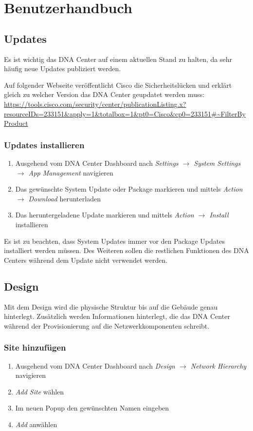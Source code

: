 \section{Benutzerhandbuch}

\subsection{Updates}
Es ist wichtig das DNA Center auf einem aktuellen Stand zu halten, da sehr häufig neue Updates publiziert werden.

Auf folgender Webseite veröffentlicht Cisco die Sicherheitslücken und erklärt gleich zu welcher Version das DNA Center geupdatet werden muss:
\url{https://tools.cisco.com/security/center/publicationListing.x?resourceIDs=233151\&apply=1\&totalbox=1\&pt0=Cisco\&cp0=233151\#~FilterByProduct}

\subsubsection{Updates installieren}
\begin{enumerate}
	\item Ausgehend vom DNA Center Dashboard nach \textit{Settings $\rightarrow$ System Settings $\rightarrow$ App Management} navigieren
	\item Das gewünschte System Update oder Package markieren und mittels \textit{Action $\rightarrow$ Download} herunterladen
	\item Das heruntergeladene Update markieren und mittels \textit{Action $\rightarrow$ Install} installieren
\end{enumerate}

Es ist zu beachten, dass System Updates immer vor den Package Updates installiert werden müssen. Des Weiteren sollen die restlichen Funktionen des DNA Centers während dem Update nicht verwendet werden.

\subsection{Design}
Mit dem Design wird die physische Struktur bis auf die Gebäude genau hinterlegt. Zusätzlich werden Informationen hinterlegt, die das DNA Center während der Provisionierung auf die Netzwerkkomponenten schreibt.

\subsubsection{Site hinzufügen}
\begin{enumerate}
	\item Ausgehend vom DNA Center Dashboard nach \textit{Design $\rightarrow$ Network Hierarchy} navigieren
	\item \textit{Add Site} wählen
	\item Im neuen Popup den gewünschten Namen eingeben
	\item \textit{Add} anwählen
\end{enumerate}

